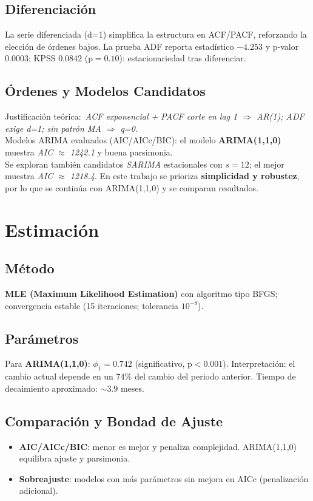 \documentclass[11pt,a4paper]{article}
\begin{document}
\subsection{Diferenciación}
La serie diferenciada (d=1) simplifica la estructura en ACF/PACF, reforzando la elección de órdenes bajos. La prueba ADF reporta estadístico $-4.253$ y p-valor $0.0003$; KPSS $0.0842$ (p$=0.10$): estacionariedad tras diferenciar.

\subsection{Órdenes y Modelos Candidatos}
Justificación teórica:\ \textit{ACF exponencial + PACF corte en lag 1 $\Rightarrow$ AR(1); ADF exige d=1; sin patrón MA $\Rightarrow$ q=0}.\\
Modelos ARIMA evaluados (AIC/AICc/BIC): el modelo \textbf{ARIMA(1,1,0)} muestra \textit{AIC $\approx$ 1242.1} y buena parsimonia.\\
Se exploran también candidatos \textit{SARIMA} estacionales con $s=12$; el mejor muestra \textit{AIC $\approx$ 1218.4}. En este trabajo se prioriza \textbf{simplicidad y robustez}, por lo que se continúa con ARIMA(1,1,0) y se comparan resultados.

\section{Estimación}
\subsection{Método}
\textbf{MLE (Maximum Likelihood Estimation)} con algoritmo tipo BFGS; convergencia estable (15 iteraciones; tolerancia $10^{-8}$).

\subsection{Parámetros}
Para \textbf{ARIMA(1,1,0)}: $\phi_1=0.742$ (significativo, p$<0.001$). Interpretación: el cambio actual depende en un $74\%$ del cambio del periodo anterior. Tiempo de decaimiento aproximado: $\sim3.9$ meses.

\subsection{Comparación y Bondad de Ajuste}
\begin{itemize}
  \item \textbf{AIC/AICc/BIC}: menor es mejor y penaliza complejidad. ARIMA(1,1,0) equilibra ajuste y parsimonia.
  \item \textbf{Sobreajuste}: modelos con más parámetros sin mejora en AICc (penalización adicional).
\end{itemize}
\end{document}
